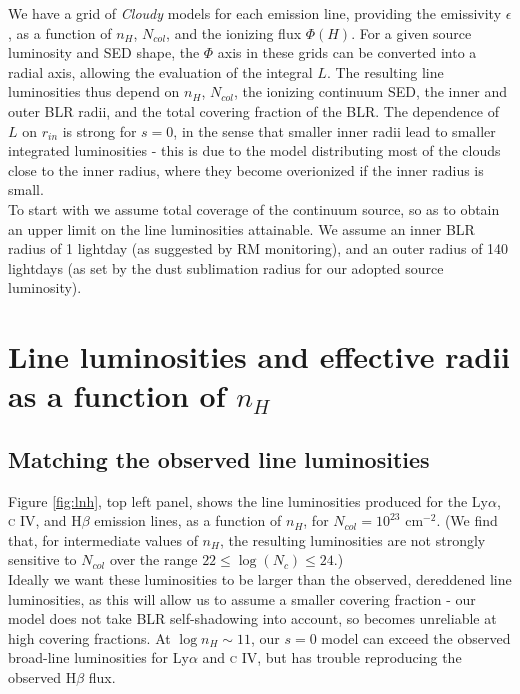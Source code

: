 \documentclass[paper=a4, fontsize=11pt]{scrartcl} %
\numberwithin{equation}{section} %
\numberwithin{figure}{section} %
\numberwithin{table}{section} %
\begin{document}
We have a grid of \emph{Cloudy} models for each emission line, providing the emissivity $\epsilon$, as a function of $n_H$, $N_{col}$, and the ionizing flux $\Phi(H)$. For a given source luminosity and SED shape, the $\Phi$ axis in these grids can be converted into a radial axis, allowing the evaluation of the integral $L$. The resulting line luminosities thus depend on $n_H$, $N_{col}$, the ionizing continuum SED, the inner and outer BLR radii, and the total covering fraction of the BLR. The dependence of $L$ on $r_{in}$ is strong for $s=0$, in the sense that smaller inner radii lead to smaller integrated luminosities - this is due to the model distributing most of the clouds close to the inner radius, where they become overionized if the inner radius is small.\\

To start with we assume total coverage of the continuum source, so as to obtain an upper limit on the line luminosities attainable. We assume an inner BLR radius of 1 lightday (as suggested by RM monitoring), and an outer radius of 140 lightdays (as set by the dust sublimation radius for our adopted source luminosity).

\section{Line luminosities and effective radii as a function of $n_H$}

\subsection{Matching the observed line luminosities}

Figure \ref{fig:lnh}, top left panel, shows the line luminosities produced for the Ly$\alpha$, \textsc{c IV}, and H$\beta$ emission lines, as a function of $n_H$, for $N_{col}=10^{23}$ cm$^{-2}$. (We find that, for intermediate values of $n_H$, the resulting luminosities are not strongly sensitive to $N_{col}$ over the range $22\le\log(N_c)\le24$.)\\ 

Ideally we want these luminosities to be larger than the observed, dereddened line luminosities, as this will allow us to assume a smaller covering fraction - our model does not take BLR self-shadowing into account, so becomes unreliable at high covering fractions. At $\log n_H\sim11$, our $s=0$ model can exceed the observed broad-line luminosities for Ly$\alpha$ and \textsc{c IV}, but has trouble reproducing the observed H$\beta$ flux.
\end{document}
